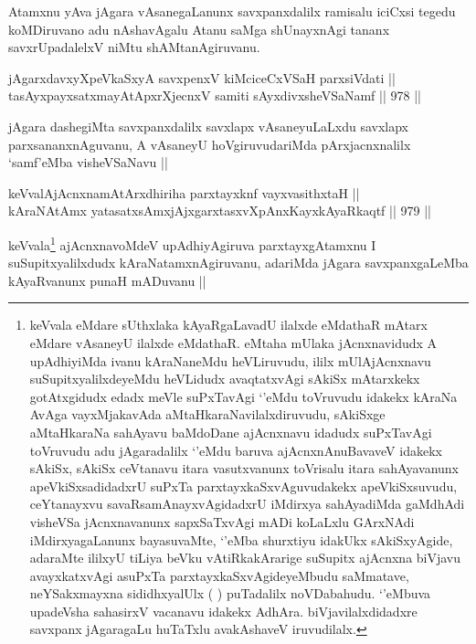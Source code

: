 \begin{artha}
Atamxnu yAva jAgara vAsanegaLanunx savxpanxdalilx ramisalu iciCxsi tegedu koMDiruvano adu nAshavAgalu Atanu saMga shUnayxnAgi tananx savxrUpadalelxV niMtu shAMtanAgiruvanu.
\end{artha}


\begin{shl}
jAgarxdavxyXpeVkaSxyA savxpenxV kiMciceCxVSaH parxsiVdati || \\
tasAyxpayxsatxmayAtApxrXjecnxV samiti sAyxdivxsheVSaNamf ||  978 ||  
\end{shl}

\begin{artha}
jAgara dashegiMta savxpanxdalilx savxlapx vAsaneyuLaLxdu savxlapx parxsananxnAguvanu, A vAsaneyU hoVgiruvudariMda pArxjacnxnalilx `samf'eMba visheVSaNavu ||
\end{artha}

\begin{shl}
keVvalAjAcnxnamAtArxdhiriha parxtayxknf vayxvasithxtaH || \\
kAraNAtAmx yatasatxsAmxjAjxgarxtasxvXpAnxKayxkAyaRkaqtf ||  979 ||  
\end{shl}

\begin{artha}
keVvala\footnote{keVvala eMdare sUthxlaka kAyaRgaLavadU ilalxde eMdathaR mAtarx eMdare vAsaneyU ilalxde eMdathaR. eMtaha mUlaka jAcnxnavidudx A upAdhiyiMda ivanu kAraNaneMdu heVLiruvudu, ililx mUlAjAcnxnavu suSupitxyalilxdeyeMdu heVLidudx avaqtatxvAgi sAkiSx mAtarxkekx gotAtxgidudx edadx meVle suPxTavAgi `\stext'eMdu toVruvudu idakekx kAraNa AvAga vayxMjakavAda aMtaHkaraNavilalxdiruvudu, sAkiSxge aMtaHkaraNa sahAyavu baMdoDane ajAcnxnavu idadudx suPxTavAgi toVruvudu adu jAgaradalilx `\stext'eMdu baruva ajAcnxnAnuBavaveV idakekx sAkiSx, sAkiSx ceVtanavu itara vasutxvanunx toVrisalu itara sahAyavanunx apeVkiSxsadidadxrU suPxTa parxtayxkaSxvAguvudakekx apeVkiSxsuvudu, ceYtanayxvu savaRsamAnayxvAgidadxrU iMdirxya sahAyadiMda gaMdhAdi visheVSa jAcnxnavanunx sapxSaTxvAgi mADi koLaLxlu GArxNAdi iMdirxyagaLanunx bayasuvaMte, `\stext'eMba shurxtiyu idakUkx sAkiSxyAgide, adaraMte ililxyU tiLiya beVku vAtiRkakArarige suSupitx ajAcnxna biVjavu avayxkatxvAgi asuPxTa parxtayxkaSxvAgideyeMbudu saMmatave, neYSakxmayxna sididhxyalUlx (   ) puTadalilx noVDabahudu. `\stext'eMbuva upadeVsha sahasirxV vacanavu idakekx AdhAra. biVjavilalxdidadxre savxpanx jAgaragaLu huTaTxlu avakAshaveV iruvudilalx.} ajAcnxnavoMdeV upAdhiyAgiruva parxtayxgAtamxnu I suSupitxyalilxdudx kAraNatamxnAgiruvanu, adariMda jAgara savxpanxgaLeMba kAyaRvanunx punaH mADuvanu ||
\end{artha}

